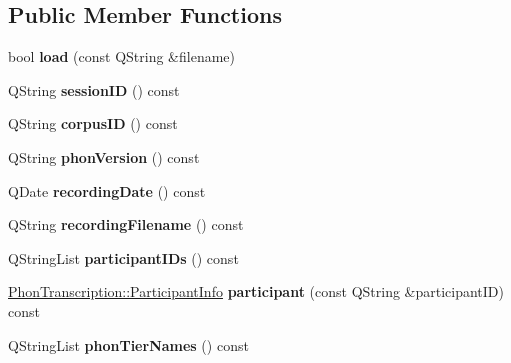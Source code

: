\subsection*{Public Member Functions}
\begin{DoxyCompactItemize}
\item 
\mbox{\label{class_phon_transcription_a98a2070f8447c9d1337fbeeefdfed7b6}} 
bool {\bfseries load} (const Q\+String \&filename)
\item 
\mbox{\label{class_phon_transcription_a886679d6cdec63050e07d8cb9dc9c36c}} 
Q\+String {\bfseries session\+ID} () const
\item 
\mbox{\label{class_phon_transcription_ac748402aa9981d206a8adfaaf8d49b82}} 
Q\+String {\bfseries corpus\+ID} () const
\item 
\mbox{\label{class_phon_transcription_a4283f83aa7b1ef21f64954eaaa3dd511}} 
Q\+String {\bfseries phon\+Version} () const
\item 
\mbox{\label{class_phon_transcription_aa5d0bbf7b0e91cff5c9b01d31dffec53}} 
Q\+Date {\bfseries recording\+Date} () const
\item 
\mbox{\label{class_phon_transcription_a66f382187e61c5faa147bd7c02540d57}} 
Q\+String {\bfseries recording\+Filename} () const
\item 
\mbox{\label{class_phon_transcription_a4320909f933e0a8965bc11b3096fd6ae}} 
Q\+String\+List {\bfseries participant\+I\+Ds} () const
\item 
\mbox{\label{class_phon_transcription_ab804fcfb76af1ce4feee7b30064ec7ed}} 
\hyperlink{class_phon_transcription_1_1_participant_info}{Phon\+Transcription\+::\+Participant\+Info} {\bfseries participant} (const Q\+String \&participant\+ID) const
\item 
\mbox{\label{class_phon_transcription_a59081f24c5e29a3b5de990a32d7ee59d}} 
Q\+String\+List {\bfseries phon\+Tier\+Names} () const
\item 

\end{DoxyCompactItemize}
